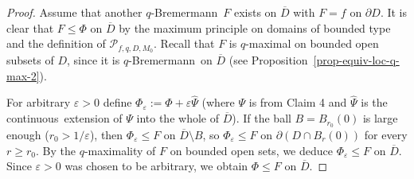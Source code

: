\documentclass[10pt,a4paper]{amsart}
\numberwithin{equation}{section}
\newcommand{\pcal}{\mathcal{P}}
\newcommand{\qbrem}{$q$-Bremermann}
\newcommand{\cont}{continuous}
\newcommand{\cld}{\overline{D}}
\newcommand{\eps}{\varepsilon}
\begin{document}
\begin{proof}
\medskip

Assume that another \qbrem\ $F$ exists on $\cld$ with $F=f$ on $\partial D$. It is clear that $F \leq \Phi$ on $\cld$ by the maximum principle on domains of bounded type and the definition of $\pcal_{f,q,D,M_0}$. Recall that $F$ is $q$-maximal on bounded open subsets of $D$, since it is \qbrem\ on $\cld$ (see Proposition~\ref{prop-equiv-loc-q-max-2}).

For arbitrary $\eps>0$ define $\Phi_\eps:=\Phi+\eps \widehat{\Psi}$ (where $\Psi$ is from Claim 4 and $\widehat{\Psi}$ is the \cont\ extension of $\Psi$ into the whole of $\cld$). If the ball $B=B_{r_0}(0)$ is large enough ($r_0>1/\eps$), then $\Phi_\eps \leq F$ on $\cld \setminus B$, so $\Phi_\eps \leq F$ on $\partial(D \cap B_r(0))$ for every $r \geq r_0$. By the $q$-maximality of $F$ on bounded open sets, we deduce $\Phi_\eps \leq F$ on $\cld$. Since $\eps>0$ was chosen to be arbitrary, we obtain $\Phi \leq F$ on $\cld$.
\end{proof}
\end{document}
